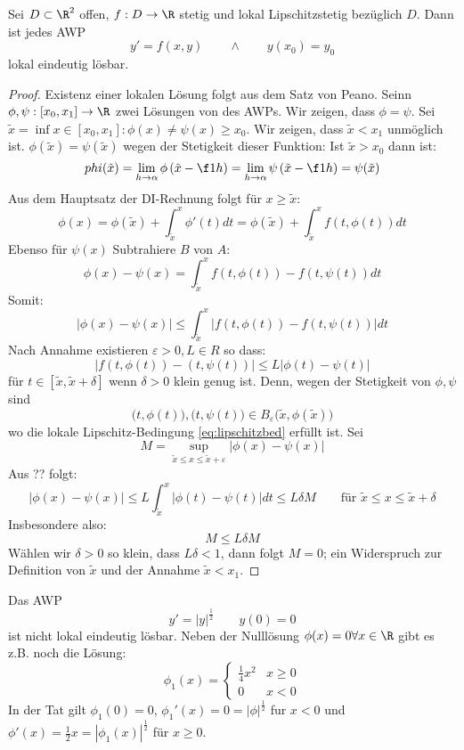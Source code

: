 \documentclass{mycourse}
\begin{document}
\begin{thm}
Sei $ D \subset \R^2$ offen, $f:D\to \R$ stetig und lokal Lipschitzstetig bezüglich $D$. Dann ist jedes
AWP
\[
y'=f(x,y) \qquad\land\qquad y(x_0)=y_0
\]
lokal eindeutig lösbar. 
\begin{proof}
Existenz einer lokalen Lösung folgt aus dem Satz von Peano.
Seinn $\phi, \psi: [x_0,x_1] \to \R$ zwei Lösungen von des AWPs. Wir zeigen, dass $\phi=\psi$.
Sei $\tilde x = \inf{x\in [x_0,x_1]: \phi(x)\ne\psi(x)} \ge x_0$.
Wir zeigen, dass $\tilde x<x_1$ unmöglich ist. $\phi(\tilde x) = \psi(\tilde x)$ wegen der Stetigkeit dieser
Funktion:
Ist $\tilde x > x_0$
dann ist:
\[
phi(\tilde x)= \lim_{h\to\alpha}\phi\left(\tilde x - \f 1h\right)=\lim_{h\to\alpha}\psi\left(\tilde x - \f 1h\right) = \psi(\tilde x)
\]
Aus dem Hauptsatz der DI-Rechnung folgt für $x\ge\tilde x$:
\[
\phi(x)= \phi(\tilde x)+\int_{\tilde x}^x\phi'(t)dt
=\phi(\tilde x) + \int_{\tilde x}^xf(t,\phi(t))dt
\]
Ebenso für $\psi(x)$
Subtrahiere $B$ von $A$:
\[
\phi(x)-\psi(x)=\int_{\tilde x}^xf(t,\phi(t))-f(t,\psi(t))dt
\]
Somit:
\[
|\phi(x)-\psi(x)| \le \int_{\tilde x}^x|f(t,\phi(t)) - f(t,\psi(t))|dt
\]
Nach Annahme existieren $\varepsilon > 0, L\in R$ so dass:
\begin{equation}
\label{eq:lipschitzbed}
|f(t,\phi(t)) -(t,\psi(t))| \le L|\phi(t)-\psi(t)|
\end{equation}
für $t\in[\tilde x, \tilde x +\delta]$ wenn $\delta >0$ klein genug ist. Denn, wegen der Stetigkeit von $\phi,\psi$ sind
\[
	\big(t,\phi(t)\big),\big(t,\psi(t)\big)\in B_\varepsilon\big(\tilde x, \phi(\tilde x)\big)
\]
wo die lokale Lipschitz-Bedingung \eqref{eq:lipschitzbed} erfüllt ist.
Sei 
\[
M=\sup_{\tilde x \le x \le \tilde x + \varepsilon}|\phi(x)-\psi(x)|
\]
Aus ?? folgt:
\[
|\phi(x)-\psi(x)|\le L\int_{\tilde x}^x|\phi(t)-\psi(t)|dt \le L\delta M \qquad \text{für } \tilde x \le x \le \tilde x+\delta
\]
Insbesondere also: 
\[
M\le L\delta M
\]
Wählen wir $\delta >0$ so klein, dass $L\delta <1$, dann folgt $M=0$;
ein Widerspruch zur Definition von $\tilde x$ und der Annahme $\tilde x<x_1$.
\end{proof}
\end{thm}

\begin{ex*}
Das AWP
\[
y'=|y|^{\frac 12} \qquad y(0)=0
\]
ist nicht lokal eindeutig lösbar. Neben der Nulllösung $\phi(x)=0 \forall x\in\R$ gibt es z.B. noch die Lösung:
\[
\phi_1(x)=
\begin{cases}
\frac 14 x^2 &x\ge 0\\
0 &x<0
\end{cases}
\]
In der Tat gilt $\phi_1(0)=0$, $\phi_1'(x)=0=|\phi|^{\frac 12}$ fur $x<0$ und $\phi'(x)=\frac 12 x = |\phi_1(x)|^{\frac 12}$ für $x\ge0$.
\end{ex*}
\end{document}
